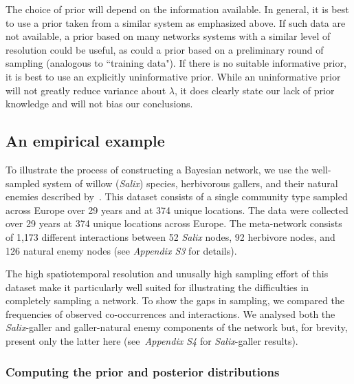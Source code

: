 \documentclass[12pt]{article}
\begin{document}
\begin{spacing}{2.0}
      The choice of prior will depend on the information available. In general, it is best to use a prior taken from a similar system as emphasized above. If such data are not available, a prior based on many networks systems with a similar level of resolution could be useful, as could a prior based on a preliminary round of sampling (analogous to ``training data"). If there is no suitable informative prior, it is best to use an explicitly uninformative prior. While an uninformative prior will not greatly reduce variance about $\lambda$, it does clearly state our lack of prior knowledge and will not bias our conclusions.


  \subsection*{An empirical example}

      To illustrate the process of constructing a Bayesian network, we use the well-sampled system of willow (\emph{Salix}) species, herbivorous gallers, and their natural enemies described by~\citet{Kopelke2017}. This dataset consists of a single community type sampled across Europe over 29 years and at 374 unique locations. The data were collected over 29 years at 374 unique locations across Europe. The meta-network consists of 1,173 different interactions between 52 \emph{Salix} nodes, 92 herbivore nodes, and 126 natural enemy nodes (see \emph{Appendix S3} for details). 


      The high spatiotemporal resolution and unusally high sampling effort of this dataset make it particularly well suited for illustrating the difficulties in completely sampling a network. To show the gaps in sampling, we compared the frequencies of observed co-occurrences and interactions. We analysed both the \emph{Salix}-galler and galler-natural enemy components of the network but, for brevity, present only the latter here (see~\emph{Appendix S4} for \emph{Salix}-galler results). 


    \subsubsection*{Computing the prior and posterior distributions}


\end{spacing}
\end{document}
